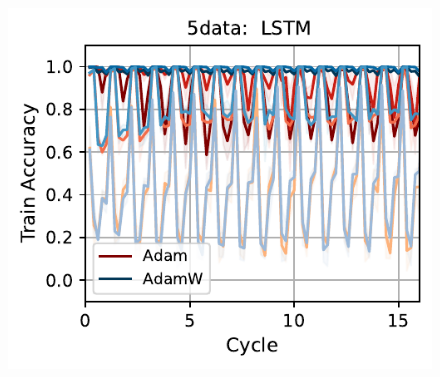 \begin{figure}[t]
{        \includegraphics[width=\textwidth]{figs/Accuracy/5nlp/lstm/5data_50.pdf}
    }\\
\end{figure}

